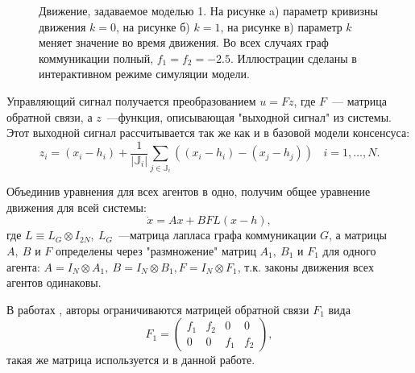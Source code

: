 \begin{figure}[h]
  \begin{minipage}[h]{0.32\linewidth}
  \end{minipage}
  \hfill
  \begin{minipage}[h]{0.32\linewidth}
  \end{minipage}
   \hfill
  \begin{minipage}[h]{0.32\linewidth}
  \end{minipage}
  \caption{Движение, задаваемое моделью 1. На рисунке a) параметр кривизны движения $k=0$, на рисунке б) $k=1$, на рисунке в) параметр $k$ меняет значение во время движения. Во всех случаях граф коммуникации полный, $f_1=f_2=-2.5$. Иллюстрации сделаны в интерактивном режиме симуляции модели.}
\label{fig:linear-motion}
\end{figure}

Управляющий сигнал получается преобразованием $u=Fz$, где $F$~--- матрица обратной связи, а $z$~---функция, описывающая "выходной сигнал" из системы. Этот выходной сигнал рассчитывается так же как и в базовой модели консенсуса:
$$
z_i=(x_i-h_i)+\frac{1}{|\mathbb{J}_i|}\sum_{j\in\mathbb{J}_i}\left((x_i-h_i)-(x_j-h_j)\right)\ \ \ \ i=1,\ldots,N.
$$

Объединив уравнения для всех агентов в одно, получим общее уравнение движения для всей системы:
\begin{equation}
\dot{x}=Ax+BFL(x-h),
\label{eq:linear-motion}
\end{equation}
где $L\equiv L_G\otimes I_{2N},\ L_G$~---матрица лапласа графа коммуникации $G$, а матрицы $A,\ B$ и $F$ определены через "размножение" матриц $A_1,\ B_1$ и $F_1$ для одного агента: $A=I_N\otimes A_1,\ B=I_N\otimes B_1, F=I_N\otimes F_1$, т.к. законы движения всех агентов одинаковы.

В работах \cite{veerman2005flocks}, \cite{lafferriere2005decentralized} авторы ограничиваются матрицей обратной связи $F_1$ вида 
$$F_1=\left( \begin{array}{cccc}
f_1 & f_2 & 0 & 0 \\
0 & 0 & f_1 & f_2 \end{array} \right),$$ такая же матрица используется и в данной работе.

